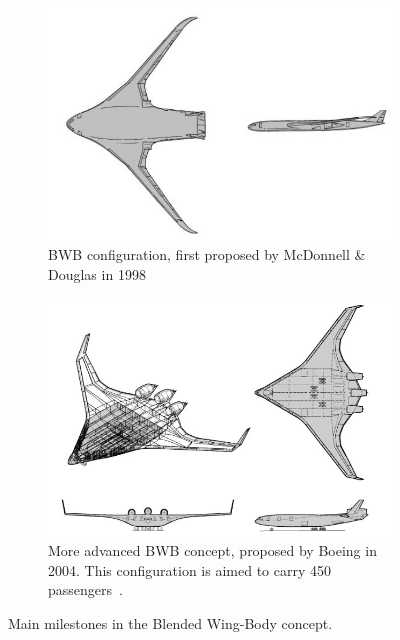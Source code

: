 \begin{figure}[h!]
	\centering
	\begin{subfigure}{0.4\textwidth}
		\centering
		\includegraphics[keepaspectratio, width=\linewidth]{images/chap1/mcdonnell_bwb.jpg}
		\caption{BWB configuration, first proposed by McDonnell \& Douglas in 1998~\cite{bib:liebeck_1998}}
		\label{fig:mcdonnell_bwb}
	\end{subfigure}
	\hspace{10mm}
	\begin{subfigure}{0.4\textwidth}
		\includegraphics[keepaspectratio, width=\linewidth]{images/chap1/boeing_bwb.jpg}
		\caption{More advanced BWB concept, proposed by Boeing in 2004. This configuration is aimed to carry 450 passengers~\cite{bib:liebeck_2004}.}
		\label{fig:boeing_bwb_450}
	\end{subfigure}
	\caption{Main milestones in the Blended Wing-Body concept.}
	\label{fig:bwb_concept_example}
\end{figure}

